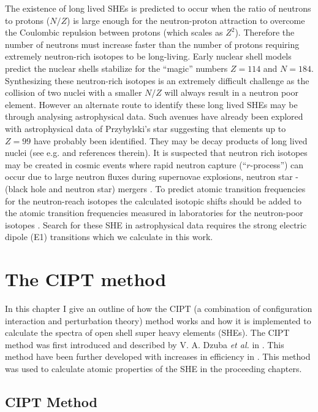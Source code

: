 \documentclass[10pt,a4paper, twoside, openright]{report}
\begin{document}
The existence of long lived SHEs is predicted to occur when the ratio of neutrons to protons ($N/Z$) is large enough for the neutron-proton attraction to overcome  the Coulombic repulsion between protons (which scales as $Z^2$). Therefore the number of neutrons must increase faster than the number of protons requiring extremely neutron-rich isotopes to be  long-living\cite{OUL2004, HHO2013}.  Early nuclear shell models predict the nuclear shells stabilize for the ``magic'' numbers $Z=114$ and $N=184$\cite{OUL2004, HHO2013}. Synthesizing these neutron-rich isotopes is an extremely difficult challenge as the collision of two nuclei with a smaller $N/Z$ will always result in a neutron poor element.  However an alternate route to identify these long lived SHEs may be through analysing astrophysical data. Such avenues have already been explored with astrophysical data of  Przybylski's star suggesting that elements up to $Z=99$ have probably  been identified\cite{Polukhina2012, Gopka2008, Fivet2007}.  They may be decay products of long lived nuclei (see e.g.   \cite{DFW17} and references therein).  It is suspected that neutron rich isotopes may be created in cosmic events where rapid neutron capture (``$r$-process'') can occur due to large neutron fluxes during supernovae explosions, neutron star - (black hole and neutron star) mergers \cite{Goriely2011, Fuller2017, Friebel2018, Schuetrumpf2015}. To predict  atomic transition frequencies  for the neutron-reach isotopes the  calculated isotopic shifts should be added to the atomic transition frequencies measured in laboratories for the neutron-poor isotopes \cite{DFW17}. Search for these SHE in astrophysical data requires the strong electric dipole (E1) transitions which we calculate in this work.

\chapter{The CIPT method} \label{chap:CIPT}
In this chapter I give an outline of how the CIPT (a combination of configuration interaction and perturbation theory) method works and how it is implemented to calculate the spectra of open shell super heavy elements (SHEs). The CIPT method was first introduced and described by V. A. Dzuba \textit{et al.} in \cite{DBHF2017}. This method have been further developed with increases in efficiency in \cite{FCI}. This method was used to calculate atomic properties of the SHE in the proceeding chapters.
\iffalse
\section{CIPT Method} \label{sec:CIPT}
\end{document}
